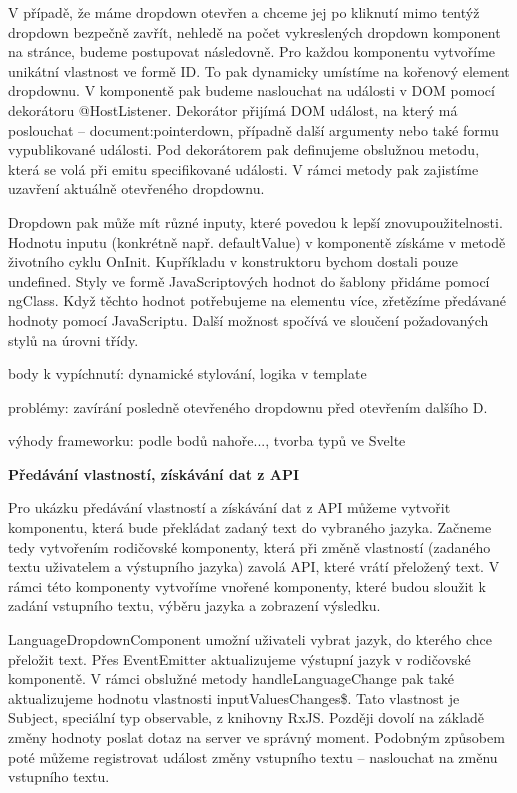 V případě, že máme dropdown otevřen a chceme jej po kliknutí mimo tentýž dropdown bezpečně zavřít, nehledě na počet vykreslených dropdown komponent na stránce, budeme postupovat následovně. 
Pro každou komponentu vytvoříme unikátní vlastnost ve formě ID. To pak dynamicky umístíme na kořenový element dropdownu. 
V komponentě pak budeme naslouchat na události v DOM pomocí dekorátoru @HostListener. 
Dekorátor přijímá DOM událost, na který má poslouchat -- document:pointerdown, případně další argumenty nebo také formu vypublikované události. 
Pod dekorátorem pak definujeme obslužnou metodu, která se volá při emitu specifikované události. V rámci metody pak zajistíme uzavření aktuálně otevřeného dropdownu.

Dropdown pak může mít různé inputy, které povedou k lepší znovupoužitelnosti. Hodnotu inputu (konkrétně např. defaultValue) v komponentě získáme v metodě životního cyklu OnInit. 
Kupříkladu v konstruktoru bychom dostali pouze undefined. Styly ve formě JavaScriptových hodnot do šablony přidáme pomocí ngClass. 
Když těchto hodnot potřebujeme na elementu více, zřetězíme předávané hodnoty pomocí JavaScriptu. Další možnost spočívá ve sloučení požadovaných stylů na úrovni třídy.

\begin{citemize}
	\item body k vypíchnutí: dynamické stylování, logika v template
	\item problémy: zavírání posledně otevřeného dropdownu před otevřením dalšího D.
	\item výhody frameworku: podle bodů nahoře..., tvorba typů ve Svelte
\end{citemize}

\begin{flushleft}
  \textbf{Předávání vlastností, získávání dat z API}
\end{flushleft}

Pro ukázku předávání vlastností a získávání dat z API můžeme vytvořit komponentu, která bude překládat zadaný text do vybraného jazyka. 
Začneme tedy vytvořením rodičovské komponenty, která při změně vlastností (zadaného textu uživatelem a výstupního jazyka) zavolá API, které vrátí přeložený text. 
V rámci této komponenty vytvoříme vnořené komponenty, které budou sloužit k zadání vstupního textu, výběru jazyka a zobrazení výsledku. 

LanguageDropdownComponent umožní uživateli vybrat jazyk, do kterého chce přeložit text. 
Přes EventEmitter aktualizujeme výstupní jazyk v rodičovské komponentě. V rámci obslužné metody handleLanguageChange pak také aktualizujeme hodnotu vlastnosti inputValuesChanges\$.
Tato vlastnost je Subject, speciální typ observable, z knihovny RxJS. Později dovolí na základě změny hodnoty poslat dotaz na server ve správný moment. 
Podobným způsobem poté můžeme registrovat událost změny vstupního textu -- naslouchat na změnu vstupního textu.


